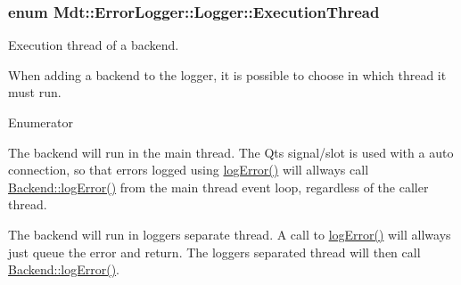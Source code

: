 \subsubsection[{\texorpdfstring{Execution\+Thread}{ExecutionThread}}]{\setlength{\rightskip}{0pt plus 5cm}enum {\bf Mdt\+::\+Error\+Logger\+::\+Logger\+::\+Execution\+Thread}}\hypertarget{class_mdt_1_1_error_logger_1_1_logger_ab6d6198b43b2bb94cede114ec67b781c}{}\label{class_mdt_1_1_error_logger_1_1_logger_ab6d6198b43b2bb94cede114ec67b781c}


Execution thread of a backend. 

When adding a backend to the logger, it is possible to choose in which thread it must run. \begin{Desc}
\item[Enumerator]\par
\begin{description}
\item[{\em 
Execute\+In\+Main\+Thread\hypertarget{class_mdt_1_1_error_logger_1_1_logger_ab6d6198b43b2bb94cede114ec67b781caac54433e68e1f766627c9fcc87f7b818}{}\label{class_mdt_1_1_error_logger_1_1_logger_ab6d6198b43b2bb94cede114ec67b781caac54433e68e1f766627c9fcc87f7b818}
}]The backend will run in the main thread. The Qt\textquotesingle{}s signal/slot is used with a auto connection, so that errors logged using \hyperlink{class_mdt_1_1_error_logger_1_1_logger_aa06a24a1d521258729ca172465b02040}{log\+Error()} will allways call \hyperlink{class_mdt_1_1_error_logger_1_1_backend_acf37cfc576269934ca8ce04e3601058d}{Backend\+::log\+Error()} from the main thread event loop, regardless of the caller thread. \item[{\em 
Execute\+In\+Separate\+Thread\hypertarget{class_mdt_1_1_error_logger_1_1_logger_ab6d6198b43b2bb94cede114ec67b781caf7dfdc36418cac0a65cea2cde2a11fd7}{}\label{class_mdt_1_1_error_logger_1_1_logger_ab6d6198b43b2bb94cede114ec67b781caf7dfdc36418cac0a65cea2cde2a11fd7}
}]The backend will run in logger\textquotesingle{}s separate thread. A call to \hyperlink{class_mdt_1_1_error_logger_1_1_logger_aa06a24a1d521258729ca172465b02040}{log\+Error()} will allways just queue the error and return. The logger\textquotesingle{}s separated thread will then call \hyperlink{class_mdt_1_1_error_logger_1_1_backend_acf37cfc576269934ca8ce04e3601058d}{Backend\+::log\+Error()}. \end{description}
\end{Desc}


